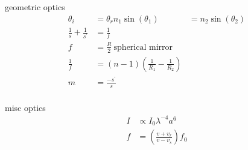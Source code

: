 \documentclass[avery5388, frame, grid]{flashcards}
\begin{document}
\begin{flashcard}{geometric optics}
  {
    \begin{align*}
      \theta_{i} &= \theta_{r}
      n_{1} \sin(\theta_{1}) &= n_{2} \sin(\theta_{2})\\
      \frac{1}{s} + \frac{1}{s^{'}} &= \frac{1}{f}\\
      f &= \frac{R}{2} \ \textrm{spherical mirror}\\
      \frac{1}{f} &= (n - 1) (\frac{1}{R_{1}} - \frac{1}{R_{2}})\\
      m &= \frac{- s^{'}}{s}\\
    \end{align*}
  }
\end{flashcard}

\begin{flashcard}{misc optics}
  {
    \begin{align*}
      I &\propto I_{0} \lambda^{-4}a^{6}\\
      f &= (\frac{v + v_{r}}{v - v_{s}}) f_{0}\\
    \end{align*}
  }
\end{flashcard}
\end{document}
